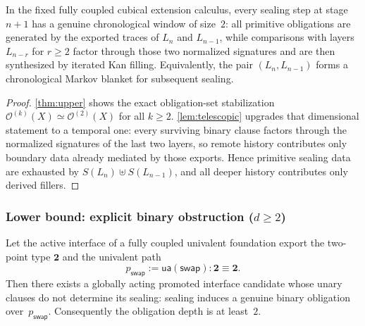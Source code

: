 \documentclass{lmcs}
\newcommand{\Ocal}{\mathcal{O}}
\begin{document}
\begin{cor}
\label{cor:chrono-window}
In the fixed fully coupled cubical extension calculus, every sealing step at stage~$n+1$ has a genuine chronological window of size~$2$: all primitive obligations are generated by the exported traces of $L_n$ and $L_{n-1}$, while comparisons with layers $L_{n-r}$ for $r \geq 2$ factor through those two normalized signatures and are then synthesized by iterated Kan filling. Equivalently, the pair $(L_n,L_{n-1})$ forms a chronological Markov blanket for subsequent sealing.
\end{cor}

\begin{proof}
\autoref{thm:upper} shows the exact obligation-set stabilization $\Ocal^{(k)}(X) \simeq \Ocal^{(2)}(X)$ for all $k \geq 2$. \autoref{lem:telescopic} upgrades that dimensional statement to a temporal one: every surviving binary clause factors through the normalized signatures of the last two layers, so remote history contributes only boundary data already mediated by those exports. Hence primitive sealing data are exhausted by $S(L_n)\uplus S(L_{n-1})$, and all deeper history contributes only derived fillers.
\end{proof}

\subsubsection{\texorpdfstring{Lower bound: explicit binary obstruction ($d \geq 2$)}{Lower bound}}

\begin{thm}
\label{thm:adjunction}
Let the active interface of a fully coupled univalent foundation export the two-point type $\mathbf{2}$ and the univalent path
\[
  p_{\mathsf{swap}} := \mathsf{ua}(\mathsf{swap}) : \mathbf{2} \equiv \mathbf{2}.
\]
Then there exists a globally acting promoted interface candidate whose unary clauses do not determine its sealing: sealing induces a genuine binary obligation over~$p_{\mathsf{swap}}$. Consequently the obligation depth is at least~$2$.
\end{thm}
\end{document}
